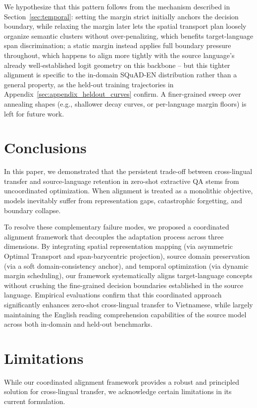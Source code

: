 \documentclass[11pt]{article}
\begin{document}
We hypothesize that this pattern follows from the mechanism described in Section~\ref{sec:temporal}: setting the margin strict initially anchors the decision boundary, while relaxing the margin later lets the spatial transport plan loosely organize semantic clusters without over-penalizing, which benefits target-language span discrimination; a static margin instead applies full boundary pressure throughout, which happens to align more tightly with the source language's already well-established logit geometry on this backbone -- but this tighter alignment is specific to the in-domain SQuAD-EN distribution rather than a general property, as the held-out training trajectories in Appendix~\ref{sec:appendix_heldout_curves} confirm. A finer-grained sweep over annealing shapes (e.g., shallower decay curves, or per-language margin floors) is left for future work.

\section{Conclusions}
In this paper, we demonstrated that the persistent trade-off between cross-lingual transfer and source-language retention in zero-shot extractive QA stems from uncoordinated optimization. When alignment is treated as a monolithic objective, models inevitably suffer from representation gaps, catastrophic forgetting, and boundary collapse. 

To resolve these complementary failure modes, we proposed a coordinated alignment framework that decouples the adaptation process across three dimensions. By integrating spatial representation mapping (via asymmetric Optimal Transport and span-barycentric projection), source domain preservation (via a soft domain-consistency anchor), and temporal optimization (via dynamic margin scheduling), our framework systematically aligns target-language concepts without crushing the fine-grained decision boundaries established in the source language. Empirical evaluations confirm that this coordinated approach significantly enhances zero-shot cross-lingual transfer to Vietnamese, while largely maintaining the English reading comprehension capabilities of the source model across both in-domain and held-out benchmarks.

\section*{Limitations}
While our coordinated alignment framework provides a robust and principled solution for cross-lingual transfer, we acknowledge certain limitations in its current formulation. 
\end{document}
